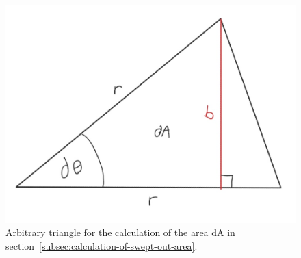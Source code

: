 \documentclass[reprint,english,notitlepage]{revtex4-2}
\begin{document}
\begin{figure}[h]
	\centering
	\includegraphics[scale=0.4]{Figures/triangle_sas}
	\caption{Arbitrary triangle for the calculation of the area dA in section~\ref{subsec:calculation-of-swept-out-area}.}\label{fig:triangle_sas}
\end{figure}


\newpage
\end{document}
